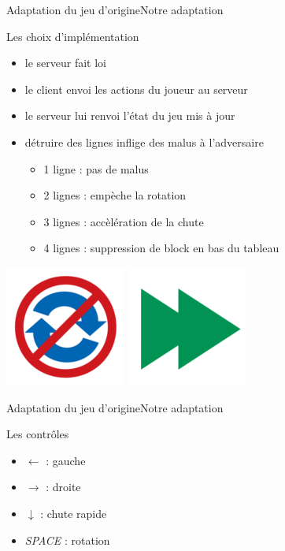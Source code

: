 \documentclass[french]{beamer}
\begin{document}
\begin{frame}{Adaptation du jeu d'origine}{Notre adaptation}
	
	\begin{block}{Les choix d'implémentation}
		\begin{itemize}
			\item le serveur fait loi
			\item le client envoi les actions du joueur au serveur
			\item le serveur lui renvoi l'état du jeu mis à jour
			\item détruire des lignes inflige des malus à l'adversaire
			\begin{itemize}
				\item 1 ligne : pas de malus
				\item 2 lignes : empèche la rotation
				\item 3 lignes : accèlération de la chute
				\item 4 lignes : suppression de block en bas du tableau
			\end{itemize}
		\end{itemize}
	\end{block}

	\begin{center}
		\includegraphics[scale=0.2]{../ressources/malusNoRotate.png}
		\includegraphics[scale=0.2]{../ressources/malusSpeed.png}
	\end{center}

\end{frame}

\begin{frame}{Adaptation du jeu d'origine}{Notre adaptation}
	\begin{block}{Les contrôles}
		\begin{itemize}
			\item $\gets$ : gauche
			\item $\to$ : droite
			\item $\downarrow$ : chute rapide
			\item \emph{SPACE} : rotation
		\end{itemize}
	\end{block}

\end{frame}
\end{document}
